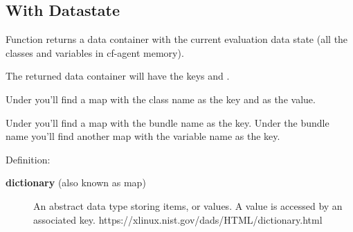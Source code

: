 \subsection{With Datastate}

Function  returns a data container with the current evaluation data state (all the classes and variables in cf-agent memory).

The returned data container will have the keys  and .

Under  you'll find a map with the class name as the key and  as the value.

Under  you'll find a map with the bundle name as the key. Under the bundle name you'll find another map with the variable name as the key.

Definition:

\begin{description}
\item[\textbf{dictionary} (also known as map)] An abstract data type storing items, or values. A value is accessed by an associated key.\newline
https://xlinux.nist.gov/dads/HTML/dictionary.html
\end{description}

